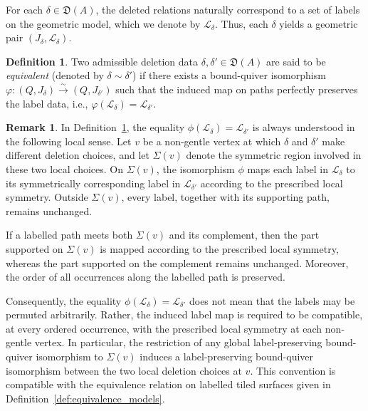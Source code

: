 \documentclass[11pt]{amsart}
\numberwithin{equation}{section}
\theoremstyle{definition}
\newtheorem{remark}[theorem]{Remark}
\newtheorem{definition}[theorem]{Definition}
\begin{document}
For each $\delta \in \mathfrak{D}(A)$, the deleted  relations naturally correspond to a set of labels on the geometric model, which we denote by $\mathcal{L}_\delta$. Thus, each $\delta$ yields a geometric pair $(J_\delta, \mathcal{L}_\delta)$.

\begin{definition}\label{def:deletion_data_equiv}
Two admissible deletion data $\delta, \delta' \in \mathfrak{D}(A)$ are said to be \emph{equivalent} (denoted by $\delta \sim \delta'$) if there exists a bound-quiver isomorphism $\varphi: (Q, J_\delta) \xrightarrow{\sim} (Q, J_{\delta'})$ such that the induced map on paths perfectly preserves the label data, i.e., $\varphi(\mathcal{L}_\delta) = \mathcal{L}_{\delta'}$.
\end{definition}


\begin{remark}\label{rem:label-perserve}
    In Definition~\ref{def:deletion_data_equiv}, the equality $\phi(\mathcal L_{\delta})=\mathcal L_{\delta'}$ is always understood in the following local sense. Let \(v\) be a non-gentle vertex at which \(\delta\) and \(\delta'\) make different deletion choices, and let \(\Sigma(v)\) denote the symmetric region involved in these two local choices. On \(\Sigma(v)\), the isomorphism \(\phi\) maps each label in
\(\mathcal L_{\delta}\) to its symmetrically corresponding label in \(\mathcal L_{\delta'}\) according to the prescribed local symmetry. Outside \(\Sigma(v)\), every label, together with its supporting path, remains unchanged.

If a labelled path meets both \(\Sigma(v)\) and its complement, then the part supported on \(\Sigma(v)\) is mapped according to the prescribed local symmetry, whereas the part supported on the complement remains unchanged. Moreover, the order of all occurrences along the labelled path is preserved.

Consequently, the equality
$\phi(\mathcal L_{\delta})=\mathcal L_{\delta'}$ 
does not mean that the labels may be permuted arbitrarily. Rather, the induced label map is required to be compatible, at every ordered occurrence, with the prescribed local symmetry at each non-gentle vertex. In particular, the restriction of any global label-preserving bound-quiver isomorphism to \(\Sigma(v)\) induces a label-preserving bound-quiver isomorphism between the two local deletion choices at \(v\). This convention is compatible with the
equivalence relation on  labelled tiled surfaces given in Definition~\ref{def:equivalence_models}.
\end{remark}
\end{document}
